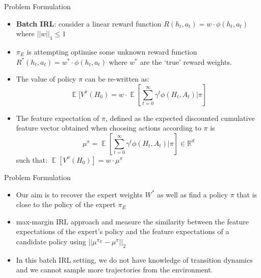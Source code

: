 \documentclass{beamer}
\DeclareMathOperator{\EX}{\mathbb{E}}%
\begin{document}
\begin{frame}{Problem Formulation}
    \begin{itemize}
        
        \item \textbf{Batch IRL}: consider a linear reward function $R(h_t, a_t) = w \cdot \phi(h_t, a_t)$ where $||w||_1 \leq 1$

        \item $\pi_E $ is attempting optimise some unknown reward function $R^*(h_t, a_t) = w^* \cdot \phi(h_t, a_t)$ where $w^*$ are the ‘true’ reward weights.

        \item The value of policy $\pi$ can be re-written as: \\
            \begin{equation*}
                \EX[V^\pi(H_0) = w \cdot \EX[\sum_{t=0}^\infty \gamma^t\phi(H_t, A_t) | \pi]
            \end{equation*}

        \item The feature expectation of $\pi$, defined as the expected discounted cumulative feature vector obtained when choosing actions according to $\pi$ is
            \begin{equation*}
                    \mu^\pi = \EX[\sum_{t=0}^\infty \gamma^t\phi(H_t, A_t) | \pi] \in \mathbb{R}^d 
                \end{equation*}
            such that: $\EX[V^\pi(H_0)] = w \cdot \mu^\pi$
    \end{itemize}
\end{frame}

\begin{frame}{Problem Formulation}
    \begin{itemize}
        \item Our aim is to recover the expert weights $W^*$ as well as find a policy $\pi$ that is close to the policy of the expert $\pi_E$

        \item max-margin IRL approach and measure the similarity between the feature expectations of the expert’s policy and the feature expectations of a candidate policy using $||\mu^{\pi_E}- \mu^\pi||_2$

        \item  In this batch IRL setting, we do not have knowledge of transition dynamics and we cannot sample more trajectories from the environment.
    \end{itemize}
\end{frame}
\end{document}
